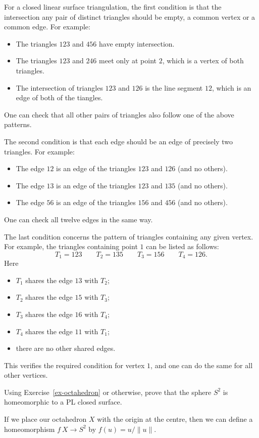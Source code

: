 \documentclass[a4paper]{amsart}
\begin{document}
\begin{solution}
 For a closed linear surface triangulation, the first condition is
 that the intersection any pair of distinct triangles should be empty,
 a common vertex or a common edge.  For example:
 \begin{itemize}
  \item The triangles $123$ and $456$ have empty intersection.
  \item The triangles $123$ and $246$ meet only at point $2$, which
   is a vertex of both triangles.
  \item The intersection of triangles $123$ and $126$ is the line
   segment $12$, which is an edge of both of the tiangles.
 \end{itemize}
 One can check that all other pairs of triangles also follow one of
 the above patterns.

 The second condition is that each edge should be an edge of precisely
 two triangles.  For example:
 \begin{itemize}
  \item The edge $12$ is an edge of the triangles $123$ and $126$ (and
   no others).
  \item The edge $13$ is an edge of the triangles $123$ and $135$ (and
   no others).
  \item The edge $56$ is an edge of the triangles $156$ and $456$ (and
   no others).
 \end{itemize}
 One can check all twelve edges in the same way.

 The last condition concerns the pattern of triangles containing any
 given vertex.  For example, the triangles containing point $1$ can be
 listed as follows:
 \[ T_1 = 123 \qquad
    T_2 = 135 \qquad
    T_3 = 156 \qquad
    T_4 = 126.
 \]
 Here 
 \begin{itemize}
  \item $T_1$ shares the edge $13$ with $T_2$;
  \item $T_2$ shares the edge $15$ with $T_3$;
  \item $T_3$ shares the edge $16$ with $T_4$;
  \item $T_4$ shares the edge $11$ with $T_1$;
  \item there are no other shared edges.
 \end{itemize}
 This verifies the required condition for vertex $1$, and one can do
 the same for all other vertices.
\end{solution}

\begin{exercise}
 Using Exercise~\ref{ex-octahedron} or otherwise, prove that the
 sphere $S^2$ is homeomorphic to a PL closed surface.
\end{exercise}
\begin{solution}
 If we place our octahedron $X$ with the origin at the centre, then we
 can define a homeomorphism $f\:X\to S^2$ by $f(u)=u/\|u\|$.
\end{solution}
\end{document}
